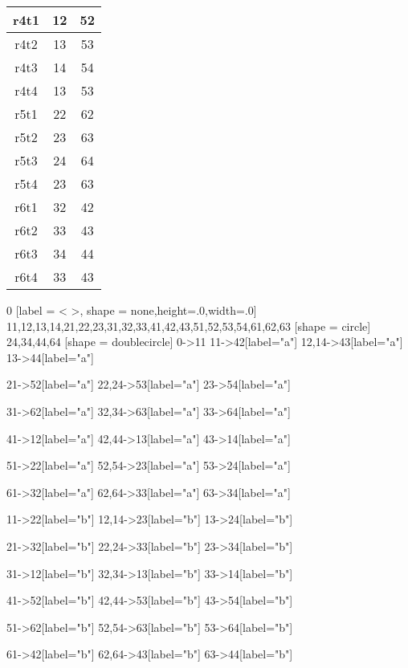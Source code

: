\documentclass{article}
\begin{document}
\begin{center}
\begin{tabular}{ |c|c|c| }
                \hline\hline
                r4t1 & 12 & 52 \\
                \hline
                r4t2 & 13 & 53 \\
                \hline
                r4t3 & 14 & 54 \\
                \hline
                r4t4 & 13 & 53 \\
                \hline\hline
                r5t1 & 22 & 62 \\
                \hline
                r5t2 & 23 & 63 \\
                \hline
                r5t3 & 24 & 64 \\
                \hline
                r5t4 & 23 & 63 \\
                \hline\hline
                r6t1 & 32 & 42 \\
                \hline
                r6t2 & 33 & 43 \\
                \hline
                r6t3 & 34 & 44 \\
                \hline
                r6t4 & 33 & 43 \\
                \hline
            \end{tabular}
          
 {
    0 [label = < >, shape = none,height=.0,width=.0]
    11,12,13,14,21,22,23,31,32,33,41,42,43,51,52,53,54,61,62,63 [shape = circle]
    24,34,44,64 [shape = doublecircle]
    0->11
    11->42[label="a"]
    12,14->43[label="a"]
    13->44[label="a"]
    
    21->52[label="a"]
    22,24->53[label="a"]
    23->54[label="a"]
    
    31->62[label="a"]
    32,34->63[label="a"]
    33->64[label="a"]

    41->12[label="a"]
    42,44->13[label="a"]
    43->14[label="a"]

    51->22[label="a"]
    52,54->23[label="a"]
    53->24[label="a"]

    61->32[label="a"]
    62,64->33[label="a"]
    63->34[label="a"]
    
    11->22[label="b"]
    12,14->23[label="b"]
    13->24[label="b"]
    
    21->32[label="b"]
    22,24->33[label="b"]
    23->34[label="b"]
    
    31->12[label="b"]
    32,34->13[label="b"]
    33->14[label="b"]

    41->52[label="b"]
    42,44->53[label="b"]
    43->54[label="b"]

    51->62[label="b"]
    52,54->63[label="b"]
    53->64[label="b"]

    61->42[label="b"]
    62,64->43[label="b"]
    63->44[label="b"]

}
\end{center}
\end{document}
